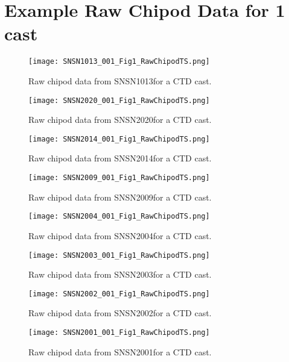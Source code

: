 \documentclass[11pt]{article}
\begin{document}
 \section{Example Raw Chipod Data for 1 cast} 

\begin{figure}[htbp] 
\texttt{[image: SNSN1013\_001\_Fig1\_RawChipodTS.png]} 
\caption{Raw chipod data from SNSN1013for a CTD cast.} 
\label{snSN1013_1} 
\end{figure} 

\begin{figure}[htbp] 
\texttt{[image: SNSN2020\_001\_Fig1\_RawChipodTS.png]} 
\caption{Raw chipod data from SNSN2020for a CTD cast.} 
\label{snSN2020_1} 
\end{figure} 

\begin{figure}[htbp] 
\texttt{[image: SNSN2014\_001\_Fig1\_RawChipodTS.png]} 
\caption{Raw chipod data from SNSN2014for a CTD cast.} 
\label{snSN2014_1} 
\end{figure} 

\begin{figure}[htbp] 
\texttt{[image: SNSN2009\_001\_Fig1\_RawChipodTS.png]} 
\caption{Raw chipod data from SNSN2009for a CTD cast.} 
\label{snSN2009_1} 
\end{figure} 

\begin{figure}[htbp] 
\texttt{[image: SNSN2004\_001\_Fig1\_RawChipodTS.png]} 
\caption{Raw chipod data from SNSN2004for a CTD cast.} 
\label{snSN2004_1} 
\end{figure} 

\begin{figure}[htbp] 
\texttt{[image: SNSN2003\_001\_Fig1\_RawChipodTS.png]} 
\caption{Raw chipod data from SNSN2003for a CTD cast.} 
\label{snSN2003_1} 
\end{figure} 

\begin{figure}[htbp] 
\texttt{[image: SNSN2002\_001\_Fig1\_RawChipodTS.png]} 
\caption{Raw chipod data from SNSN2002for a CTD cast.} 
\label{snSN2002_1} 
\end{figure} 

\begin{figure}[htbp] 
\texttt{[image: SNSN2001\_001\_Fig1\_RawChipodTS.png]} 
\caption{Raw chipod data from SNSN2001for a CTD cast.} 
\label{snSN2001_1} 
\end{figure} 
\end{document}
